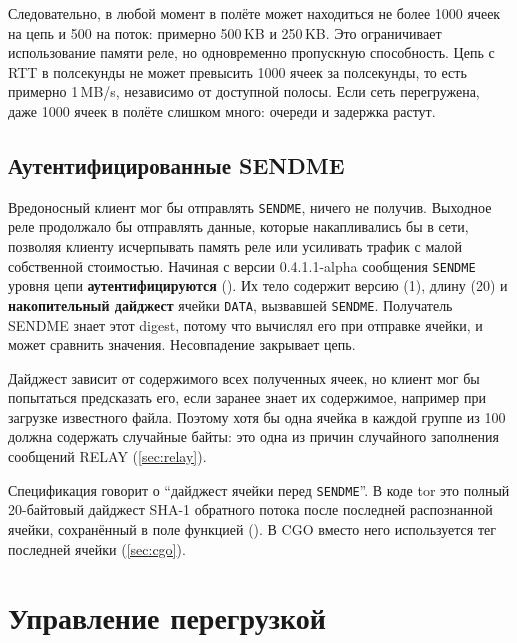 Следовательно, в любой момент в полёте может находиться не более 1000 ячеек на цепь и 500 на поток: примерно 500\,KB и 250\,KB. Это ограничивает использование памяти реле, но одновременно пропускную способность. Цепь с RTT в полсекунды не может превысить 1000 ячеек за полсекунды, то есть примерно 1\,MB/s, независимо от доступной полосы. Если сеть перегружена, даже 1000 ячеек в полёте слишком много: очереди и задержка растут.

\subsection{Аутентифицированные SENDME}

Вредоносный клиент мог бы отправлять \texttt{SENDME}, ничего не получив. Выходное реле продолжало бы отправлять данные, которые накапливались бы в сети, позволяя клиенту исчерпывать память реле или усиливать трафик с малой собственной стоимостью. Начиная с версии 0.4.1.1-alpha сообщения \texttt{SENDME} уровня цепи \textbf{аутентифицируются} (). Их тело содержит версию (1), длину (20) и \textbf{накопительный дайджест} ячейки \texttt{DATA}, вызвавшей \texttt{SENDME}. Получатель SENDME знает этот digest, потому что вычислял его при отправке ячейки, и может сравнить значения. Несовпадение закрывает цепь.

Дайджест зависит от содержимого всех полученных ячеек, но клиент мог бы попытаться предсказать его, если заранее знает их содержимое, например при загрузке известного файла. Поэтому хотя бы одна ячейка в каждой группе из 100 должна содержать случайные байты: это одна из причин случайного заполнения сообщений RELAY (\cref{sec:relay}).

\begin{approfondimento}
Спецификация говорит о \enquote{дайджест ячейки перед \texttt{SENDME}}. В коде tor это полный 20-байтовый дайджест SHA-1 обратного потока после последней распознанной ячейки, сохранённый в поле  функцией  (). В CGO вместо него используется тег последней ячейки (\cref{sec:cgo}).
\end{approfondimento}

\section{Управление перегрузкой}\label{sec:cc}

